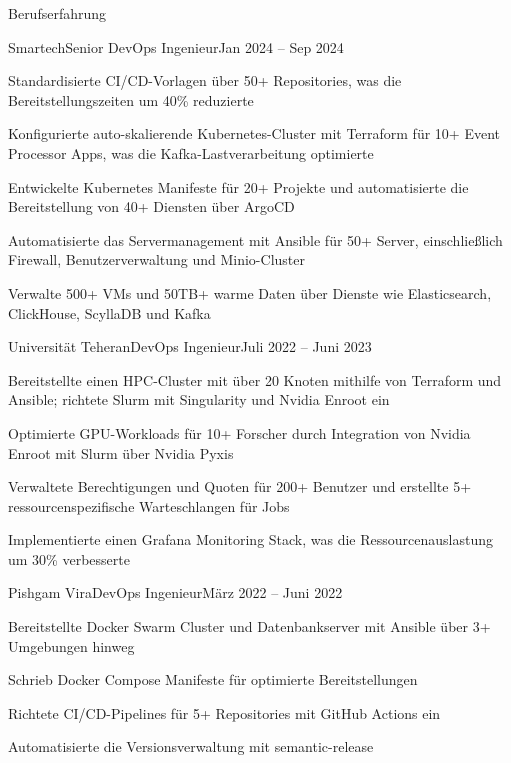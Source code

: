 \documentclass[]{main}
\begin{document}
\begin{section}{Berufserfahrung}
 \begin{subsection}{Smartech}{Senior DevOps Ingenieur}{Jan 2024 -- Sep 2024}{}
     \item Standardisierte CI/CD-Vorlagen über 50+ Repositories, was die Bereitstellungszeiten um 40\% reduzierte
     \item Konfigurierte auto-skalierende Kubernetes-Cluster mit Terraform für 10+ Event Processor Apps, was die Kafka-Lastverarbeitung optimierte
     \item Entwickelte Kubernetes Manifeste für 20+ Projekte und automatisierte die Bereitstellung von 40+ Diensten über ArgoCD
     \item Automatisierte das Servermanagement mit Ansible für 50+ Server, einschließlich Firewall, Benutzerverwaltung und Minio-Cluster
     \item Verwalte 500+ VMs und 50TB+ warme Daten über Dienste wie Elasticsearch, ClickHouse, ScyllaDB und Kafka
 \end{subsection}

 \begin{subsection}{Universität Teheran}{DevOps Ingenieur}{Juli 2022 -- Juni 2023}{}
     \item Bereitstellte einen HPC-Cluster mit über 20 Knoten mithilfe von Terraform und Ansible; richtete Slurm mit Singularity und Nvidia Enroot ein
     \item Optimierte GPU-Workloads für 10+ Forscher durch Integration von Nvidia Enroot mit Slurm über Nvidia Pyxis
     \item Verwaltete Berechtigungen und Quoten für 200+ Benutzer und erstellte 5+ ressourcenspezifische Warteschlangen für Jobs
     \item Implementierte einen Grafana Monitoring Stack, was die Ressourcenauslastung um 30\% verbesserte
 \end{subsection}

 \begin{subsection}{Pishgam Vira}{DevOps Ingenieur}{März 2022 -- Juni 2022}{}
     \item Bereitstellte Docker Swarm Cluster und Datenbankserver mit Ansible über 3+ Umgebungen hinweg
     \item Schrieb Docker Compose Manifeste für optimierte Bereitstellungen
     \item Richtete CI/CD-Pipelines für 5+ Repositories mit GitHub Actions ein
     \item Automatisierte die Versionsverwaltung mit semantic-release
 \end{subsection}


\end{section}
\end{document}
